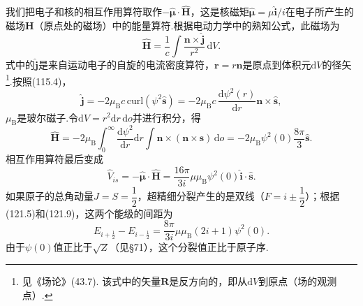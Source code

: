 我们把电子和核的相互作用算符取作$-\hat{\boldsymbol{\mu}}\cdot\hat{\boldsymbol{H}}$，这是核磁矩$\hat{\boldsymbol{\mu}}=\mu\hat{\boldsymbol{i}}/i$在电子所产生的磁场$\boldsymbol{H}$（原点处的磁场）中的能量算符.根据电动力学中的熟知公式，此磁场为
\begin{equation}
  \hat{\boldsymbol{H}}=\frac{1}{c}\int\frac{\boldsymbol{n}\times\hat{\boldsymbol{j}}}{r^2}\,\mathrm{d}V.
\end{equation}
式中的$\hat{\boldsymbol{j}}$是来自运动电子的自旋的电流密度算符，$\boldsymbol{r}=r\boldsymbol{n}$是原点到体积元$\mathrm{d}V$的径矢\footnote{见《场论》(43.7). 该式中的矢量$\boldsymbol{R}$是反方向的，即从$\mathrm{d}V$到原点（场的观测点）.}.按照(115.4)，
\begin{equation*}
  \hat{\boldsymbol{j}}=-2\mu_\mathrm{B}c\,\mathrm{curl}(\psi^2\hat{\boldsymbol{s}})
  =-2\mu_\mathrm{B}c\,\frac{\mathrm{d}\psi^2(r)}{\mathrm{d}r}\boldsymbol{n}\times\hat{\boldsymbol{s}},
\end{equation*}
$\mu_\mathrm{B}$是玻尔磁子.令$\mathrm{d}V=r^2\mathrm{d}r\,\mathrm{d}o$并进行积分，得
\begin{equation*}
  \hat{\boldsymbol{H}}=-2\mu_\mathrm{B}\int_0^{\infty}\frac{\mathrm{d}\psi^2}{\mathrm{d}r}\mathrm{d}r
  \int\boldsymbol{n}\times(\boldsymbol{n}\times\boldsymbol{s})\,\mathrm{d}o
  =-2\mu_\mathrm{B}\psi^2(0)\frac{8\pi}{3}\hat{\boldsymbol{s}}.
\end{equation*}
相互作用算符最后变成
\begin{equation}
  \hat{V}_{is}=-\hat{\boldsymbol{\mu}}\cdot\hat{\boldsymbol{H}}
  =\frac{16\pi}{3i}\mu\mu_\mathrm{B}\psi^2(0)\hat{\boldsymbol{i}}\cdot\hat{\boldsymbol{s}}.
\end{equation}
如果原子的总角动量$J=S=\dfrac{1}{2}$，超精细分裂产生的是双线（$F=i\pm\dfrac{1}{2}$）；根据(121.5)和(121.9)，这两个能级的间距为
\begin{equation}
  E_{i+\frac{1}{2}}-E_{i-\frac{1}{2}}
  =\frac{8\pi}{3i}\mu\mu_\mathrm{B}\left(2i+1\right)\psi^2(0).
\end{equation}
由于$\psi(0)$值正比于$\sqrt{Z}$（见§71），这个分裂值正比于原子序.

